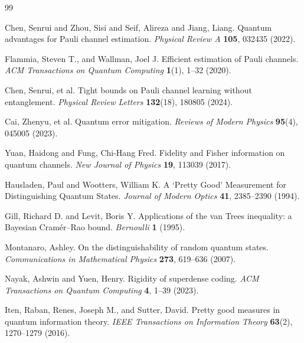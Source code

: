\documentclass[12pt]{article}
\begin{document}
\begin{thebibliography}{99}

Chen, Senrui and Zhou, Sisi and Seif, Alireza and Jiang, Liang.
Quantum advantages for Pauli channel estimation.
\emph{Physical Review A} \textbf{105}, 032435 (2022).

Flammia, Steven T., and Wallman, Joel J.
Efficient estimation of Pauli channels.
\emph{ACM Transactions on Quantum Computing} \textbf{1}(1), 1--32 (2020).

Chen, Senrui, et al.
Tight bounds on Pauli channel learning without entanglement.
\emph{Physical Review Letters} \textbf{132}(18), 180805 (2024).

Cai, Zhenyu, et al.
Quantum error mitigation.
\emph{Reviews of Modern Physics} \textbf{95}(4), 045005 (2023).

Yuan, Haidong and Fung, Chi-Hang Fred.
Fidelity and Fisher information on quantum channels.
\emph{New Journal of Physics} \textbf{19}, 113039 (2017).

Hausladen, Paul and Wootters, William K.
A `Pretty Good' Measurement for Distinguishing Quantum States.
\emph{Journal of Modern Optics} \textbf{41}, 2385--2390 (1994).

Gill, Richard D. and Levit, Boris Y.
Applications of the van Trees inequality: a Bayesian Cram\'er--Rao bound.
\emph{Bernoulli} \textbf{1} (1995).

Montanaro, Ashley.
On the distinguishability of random quantum states.
\emph{Communications in Mathematical Physics} \textbf{273}, 619--636 (2007).

Nayak, Ashwin and Yuen, Henry.
Rigidity of superdense coding.
\emph{ACM Transactions on Quantum Computing} \textbf{4}, 1--39 (2023).

Iten, Raban, Renes, Joseph M., and Sutter, David.
Pretty good measures in quantum information theory.
\emph{IEEE Transactions on Information Theory} \textbf{63}(2), 1270--1279 (2016).

\end{thebibliography}
\end{document}
